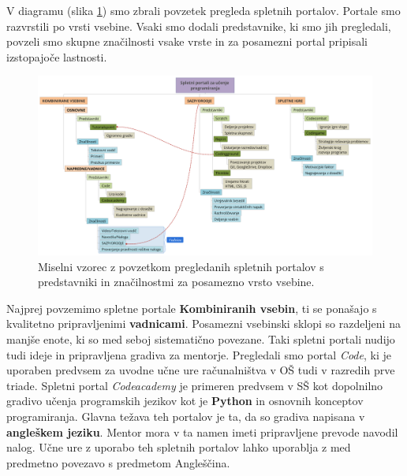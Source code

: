 V diagramu (slika \ref{fig:spup_povzetek}) smo zbrali povzetek
pregleda spletnih portalov. Portale smo razvrstili po vrsti
vsebine. Vsaki smo dodali predstavnike, ki smo jih pregledali, povzeli
smo skupne značilnosti vsake vrste in za posamezni portal pripisali
izstopajoče lastnosti.
\begin{figure}[h!]
  \centering
    \includegraphics [width=1\linewidth, keepaspectratio =
   1] {./images/SPUP_povzetek-xmind.png}
   \caption{Miselni vzorec z povzetkom pregledanih spletnih portalov s
   predstavniki in značilnostmi za posamezno vrsto vsebine.}
 \label{fig:spup_povzetek}
\end{figure}

Najprej povzemimo spletne portale \textbf{Kombiniranih vsebin}, ti se
ponašajo s kvalitetno pripravljenimi \textbf{vadnicami}. Posamezni
vsebinski sklopi so razdeljeni na manjše enote, ki so med seboj
sistematično povezane. Taki spletni portali nudijo tudi ideje in
pripravljena gradiva za mentorje. Pregledali smo portal \emph{Code},
ki je uporaben predvsem za uvodne učne ure računalništva v OŠ tudi v
razredih prve triade. Spletni portal \emph{Codeacademy} je primeren
predvsem v SŠ kot dopolnilno gradivo učenja programskih jezikov kot je
\textbf{Python} in osnovnih konceptov programiranja. Glavna težava teh
portalov je ta, da so gradiva napisana v \textbf{angleškem
  jeziku}. Mentor mora v ta namen imeti pripravljene prevode navodil
nalog. Učne ure z uporabo teh spletnih portalov lahko uporablja z med
predmetno povezavo s predmetom Angleščina.

